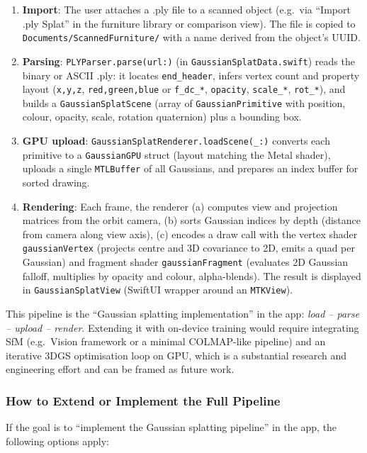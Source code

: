 \begin{enumerate}
    \item \textbf{Import}: The user attaches a .ply file to a scanned object (e.g.\ via ``Import .ply Splat'' in the furniture library or comparison view). The file is copied to \texttt{Documents/ScannedFurniture/} with a name derived from the object's UUID.
    \item \textbf{Parsing}: \texttt{PLYParser.parse(url:)} (in \texttt{GaussianSplatData.swift}) reads the binary or ASCII .ply: it locates \texttt{end_header}, infers vertex count and property layout (\texttt{x,y,z}, \texttt{red,green,blue} or \texttt{f\_dc\_*}, \texttt{opacity}, \texttt{scale\_*}, \texttt{rot\_*}), and builds a \texttt{GaussianSplatScene} (array of \texttt{GaussianPrimitive} with position, colour, opacity, scale, rotation quaternion) plus a bounding box.
    \item \textbf{GPU upload}: \texttt{GaussianSplatRenderer.loadScene(_:)} converts each primitive to a \texttt{GaussianGPU} struct (layout matching the Metal shader), uploads a single \texttt{MTLBuffer} of all Gaussians, and prepares an index buffer for sorted drawing.
    \item \textbf{Rendering}: Each frame, the renderer (a) computes view and projection matrices from the orbit camera, (b) sorts Gaussian indices by depth (distance from camera along view axis), (c) encodes a draw call with the vertex shader \texttt{gaussianVertex} (projects centre and 3D covariance to 2D, emits a quad per Gaussian) and fragment shader \texttt{gaussianFragment} (evaluates 2D Gaussian falloff, multiplies by opacity and colour, alpha-blends). The result is displayed in \texttt{GaussianSplatView} (SwiftUI wrapper around an \texttt{MTKView}).
\end{enumerate}

This pipeline is the ``Gaussian splatting implementation'' in the app: \emph{load -- parse -- upload -- render}. Extending it with on-device training would require integrating SfM (e.g.\ Vision framework or a minimal COLMAP-like pipeline) and an iterative 3DGS optimisation loop on GPU, which is a substantial research and engineering effort and can be framed as future work.

\subsubsection{How to Extend or Implement the Full Pipeline}

If the goal is to ``implement the Gaussian splatting pipeline'' in the app, the following options apply:


